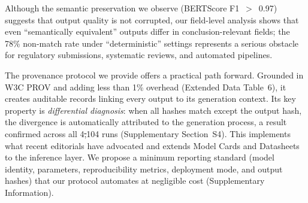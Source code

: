 \documentclass[sn-nature]{sn-jnl}
\makeatletter
\providecommand{\DIFadd}[1]{{\protect\color{blue}\uwave{#1}}} %
\providecommand{\DIFdel}[1]{{\protect\color{red}\sout{#1}}} %
\providecommand{\DIFaddbegin}{} %
\providecommand{\DIFaddend}{} %
\providecommand{\DIFdelbegin}{} %
\providecommand{\DIFdelend}{} %
\providecommand{\DIFscaledelfig}{0.5}
\newlength{\DIFdelgraphicswidth} %
\newlength{\DIFdelgraphicsheight} %
\providecommand{\DIFaddincludegraphics}[2][]{{\color{blue}\fbox{\DIFOincludegraphics[#1]{#2}}}} %
\providecommand{\DIFdelincludegraphics}[2][]{%
\sbox{\DIFdelgraphicsbox}{\DIFOincludegraphics[#1]{#2}}%
\settoboxwidth{\DIFdelgraphicswidth}{\DIFdelgraphicsbox} %
\settoboxtotalheight{\DIFdelgraphicsheight}{\DIFdelgraphicsbox} %
\scalebox{\DIFscaledelfig}{%
\parbox[b]{\DIFdelgraphicswidth}{\usebox{\DIFdelgraphicsbox}\\[-\baselineskip] \rule{\DIFdelgraphicswidth}{0em}}\llap{\resizebox{\DIFdelgraphicswidth}{\DIFdelgraphicsheight}{%
\setlength{\unitlength}{\DIFdelgraphicswidth}%
\begin{picture}(1,1)%
\thicklines\linethickness{2pt} %
{\color[rgb]{1,0,0}\put(0,0){\framebox(1,1){}}}%
{\color[rgb]{1,0,0}\put(0,0){\line( 1,1){1}}}%
{\color[rgb]{1,0,0}\put(0,1){\line(1,-1){1}}}%
\end{picture}%
}\hspace*{3pt}}} %
} %
\DeclareRobustCommand{\DIFaddbegin}{\DIFOaddbegin \let\includegraphics\DIFaddincludegraphics} %
\DeclareRobustCommand{\DIFaddend}{\DIFOaddend \let\includegraphics\DIFOincludegraphics} %
\DeclareRobustCommand{\DIFdelbegin}{\DIFOdelbegin \let\includegraphics\DIFdelincludegraphics} %
\DeclareRobustCommand{\DIFdelend}{\DIFOaddend \let\includegraphics\DIFOincludegraphics} %
\let\sout@orig\sout %
\renewcommand{\sout}[1]{\ifmmode\text{\sout@orig{\ensuremath{#1}}}\else\sout@orig{#1}\fi} %
\makeatother
\begin{document}
Although the semantic preservation we observe (BERTScore F1~$>$~0.97) suggests that output quality is not corrupted, our field-level analysis shows that even ``semantically equivalent'' outputs differ in conclusion-relevant fields; the 78\% non-match rate under ``deterministic'' settings represents a serious obstacle for regulatory submissions, systematic reviews, and automated pipelines.

The provenance protocol we provide offers a practical path forward.
Grounded in W3C PROV\cite{w3cprov2013} and adding less than 1\% overhead (Extended Data Table~6), it creates auditable records linking every output to its generation context.
Its key property is \emph{differential diagnosis}: when all hashes match except the output hash, the divergence is automatically attributed to the generation process, a result confirmed across all 4\DIFdelbegin \DIFdel{,}\DIFdelend \DIFaddbegin {\DIFadd{,}}\DIFaddend 104 runs (Supplementary Section~S4).
This implements what recent editorials have advocated\cite{editorial2024framework} and extends Model Cards\cite{mitchell2019model} and Datasheets\cite{gebru2021datasheets} to the inference layer.
We propose a minimum reporting standard (model identity, parameters, reproducibility metrics, deployment mode, and output hashes) that our protocol automates at negligible cost (Supplementary Information).
\end{document}
